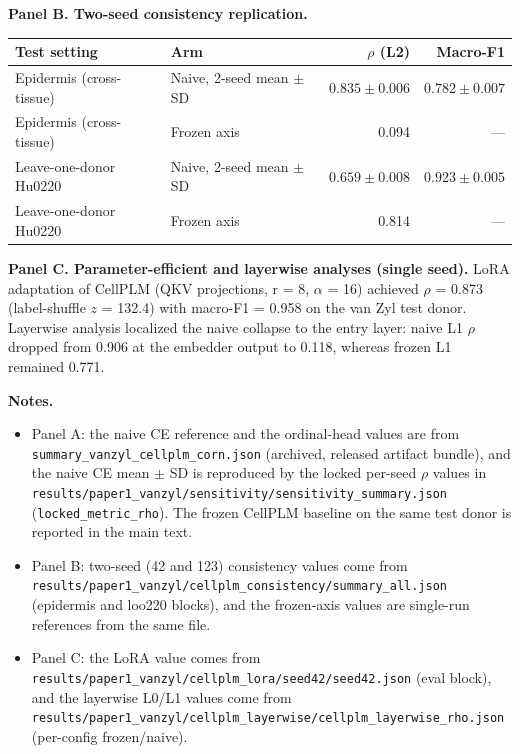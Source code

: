 \documentclass[12pt,a4paper]{article}
\begin{document}
\textbf{Panel B. Two-seed consistency replication.}

\medskip
\begingroup
\small
\centering
\begin{tabular}{llrr}
\toprule
Test setting & Arm & $\rho$ (L2) & Macro-F1 \\
\midrule
Epidermis (cross-tissue) & Naive, 2-seed mean $\pm$ SD & $0.835 \pm 0.006$ & $0.782 \pm 0.007$ \\
Epidermis (cross-tissue) & Frozen axis & 0.094 & --- \\
Leave-one-donor Hu0220 & Naive, 2-seed mean $\pm$ SD & $0.659 \pm 0.008$ & $0.923 \pm 0.005$ \\
Leave-one-donor Hu0220 & Frozen axis & 0.814 & --- \\
\bottomrule
\end{tabular}
\endgroup

\textbf{Panel C. Parameter-efficient and layerwise analyses (single seed).} LoRA adaptation of CellPLM (QKV projections, r = 8, $\alpha$ = 16) achieved $\rho$ = 0.873 (label-shuffle $z$ = 132.4) with macro-F1 = 0.958 on the van Zyl test donor. Layerwise analysis localized the naive collapse to the entry layer: naive L1 $\rho$ dropped from 0.906 at the embedder output to 0.118, whereas frozen L1 remained 0.771.

\textbf{Notes.}
\begin{itemize}
  \item Panel A: the naive CE reference and the ordinal-head values are from \texttt{summary\_vanzyl\_cellplm\_corn.json} (archived, released artifact bundle), and the naive CE mean $\pm$ SD is reproduced by the locked per-seed $\rho$ values in \texttt{results/paper1\_vanzyl/sensitivity/sensitivity\_summary.json} (\texttt{locked\_metric\_rho}). The frozen CellPLM baseline on the same test donor is reported in the main text.
  \item Panel B: two-seed (42 and 123) consistency values come from \texttt{results/paper1\_vanzyl/cellplm\_consistency/summary\_all.json} (epidermis and loo220 blocks), and the frozen-axis values are single-run references from the same file.
  \item Panel C: the LoRA value comes from \texttt{results/paper1\_vanzyl/\allowbreak cellplm\_lora/seed42/seed42.json} (eval block), and the layerwise L0/L1 values come from \texttt{results/paper1\_vanzyl/\allowbreak cellplm\_layerwise/cellplm\_layerwise\_rho.json} (per-config frozen/naive).
\end{itemize}

\needspace{45mm}
\end{document}
